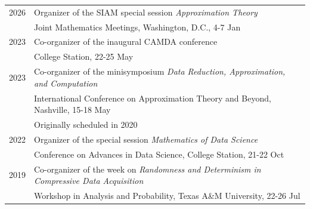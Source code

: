 \documentclass[11pt]{article}
\begin{document}
\begin{tabular}{ll}
2026\phantom{-??} & Organizer of the SIAM special session {\em Approximation Theory}\\
& Joint Mathematics Meetings, Washington, D.C., 4-7 Jan\\
2023 & Co-organizer of the inaugural CAMDA conference\\
& College Station, 22-25 May\\
%
2023 & Co-organizer of the minisymposium {\sl Data Reduction, Approximation, and Computation}\\
& International Conference on Approximation Theory and Beyond, Nashville,  15-18 May\\
& {\small Originally scheduled in 2020}\\
2022 & Organizer of the special session {\em Mathematics of Data Science}\\
& Conference on Advances in Data Science, College Station, 21-22 Oct\\
2019 & Co-organizer of the week on {\sl Randomness and Determinism in Compressive Data Acquisition}\\
& Workshop in Analysis and Probability, Texas A\&M University,  22-26 Jul
\end{tabular}
\end{document}

